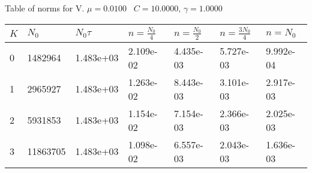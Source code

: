 \begin{center}
Table of norms for V. $\mu = 0.0100$ \, $C = 10.0000$, $\gamma = 1.0000$
  
\begin{tabular}{|p{0.8in}|p{0.8in}|p{0.8in}|p{0.8in}|p{0.8in}|p{0.8in}|p{0.8in}|} \hline
$K$ &$N_0$ &$N_0 \tau$ &$n = \frac{N_0}{4}$ &$n = \frac{N_0}{2}$ &$n = \frac{3N_0}{4}$ &$n = N_0$ \\ \hline 
0 &1482964 &1.483e+03 &2.109e-02 &4.435e-03 &5.727e-03 &9.992e-04 \\ \hline 
1 &2965927 &1.483e+03 &1.263e-02 &8.443e-03 &3.101e-03 &2.917e-03 \\ \hline 
2 &5931853 &1.483e+03 &1.154e-02 &7.154e-03 &2.366e-03 &2.025e-03 \\ \hline 
3 &11863705 &1.483e+03 &1.098e-02 &6.557e-03 &2.043e-03 &1.636e-03 \\ \hline 

\end{tabular}\\[20pt]
\end{center}
